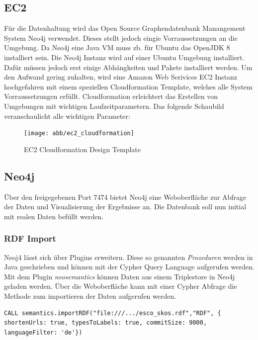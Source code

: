 \subsection{EC2 }
Für die Datenhaltung wird das Open Source Graphendatenbank Manangement System Neo4j verwendet. Dieses stellt jedoch eingie Vorraussetzungen an die Umgebung\cite{neo4jsysreq}. Da Neo4j eine Java VM muss zb. für Ubuntu das OpenJDK 8 installiert sein.
Die Neo4j Instanz wird auf einer Ubuntu Umgebung installiert. Dafür müssen jedoch erst einige Abhängkeiten und Pakete installiert werden. Um den Aufwand gering zuhalten, wird eine Amazon Web Serivices EC2 Instanz hochgefahren mit einem speziellen Cloudformation Template, welches alle System Vorraussetzungen erfüllt. Cloudformation erleichtert das Erstellen von Umgebungen mit wichtigen Laufzeitparametern. Das folgende Schaubild veranschaulicht alle wichtigen Parameter:

\begin{figure}[htb]
 \centering
 \texttt{[image: abb/ec2\_cloudformation]}
 \caption[Beschreibung]{EC2 Cloudformation Design Template}
\label{fig:EC2 Cloudformation Template}
\end{figure}

\pagebreak

\subsection{Neo4j}

Über den freigegebenen Port 7474 bietet Neo4j eine Weboberfläche zur Abfrage der Daten und Visualisierung der Ergebnisse an. Die Datenbank soll nun initial mit realen Daten befüllt werden. 

\subsubsection{RDF Import}

Neoj4 lässt sich über Plugins erweitern. Diese so genannten \textit{Prozeduren} werden in Java geschrieben und können mit der Cypher Query Language aufgerufen werden.
Mit dem Plugin \textit{neosemantics} können Daten aus einem Triplestore in Neo4j geladen werden. Über die Weboberfläche kann mit einer Cypher Abfrage die Methode zum importieren der Daten aufgerufen werden. 

\lstset{language=xml}
\lstset{language=java}
\lstset{breaklines=true}
\begin{lstlisting}[frame=htrbl, caption={importRDF Prozeduraufruf}, label={lst:importRDF}]
CALL semantics.importRDF("file:///.../esco_skos.rdf","RDF", { shortenUrls: true, typesToLabels: true, commitSize: 9000, languageFilter: 'de'})


\end{lstlisting}




